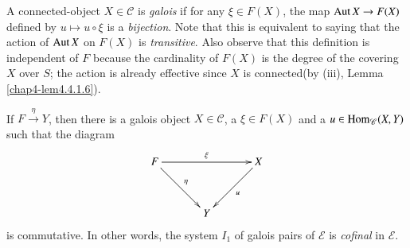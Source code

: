 \setcounter{subdefin}{6}
\begin{subdefin}\label{chap4-defi4.4.1.7}
A connected-object $X\in\mathscr{C}$ is {\em galois} if for any
$\xi\in F(X)$, the map $\operatorname{Aut} X\to F(X)$ defined by $u\mapsto u\circ
\xi$ is a {\em bijection}. Note that this is equivalent to saying that
the action of $\operatorname{Aut} X$ on $F(X)$ is {\em transitive}. Also observe
that this definition is independent of $F$ because the cardinality of
$F(X)$ is the degree of the covering $X$ over $S$; the action is
already effective since $X$ is connected\pageoriginale (by (iii),
Lemma \ref{chap4-lem4.4.1.6}). 
\end{subdefin}

\setcounter{sublemma}{7}
\begin{sublemma}\label{lem4.4.1.8}
If $F\xrightarrow{\eta}Y$, then there is a galois object
$X\in\mathscr{C}$, a $\xi\in F(X)$ and a $u\in
\operatorname{Hom}_{\mathscr{C}}(X,Y)$ such that the diagram
\[
\xymatrix@=1.2cm{
F\ar[rr]^{\xi}\ar[dr]^{\eta} & & X\ar[dl]^{u}\\
 & Y &
}
\]
is commutative. In other words, the system $I_{1}$ of galois pairs of
$\mathscr{E}$ is {\em cofinal} in $\mathscr{E}$.
\end{sublemma}


